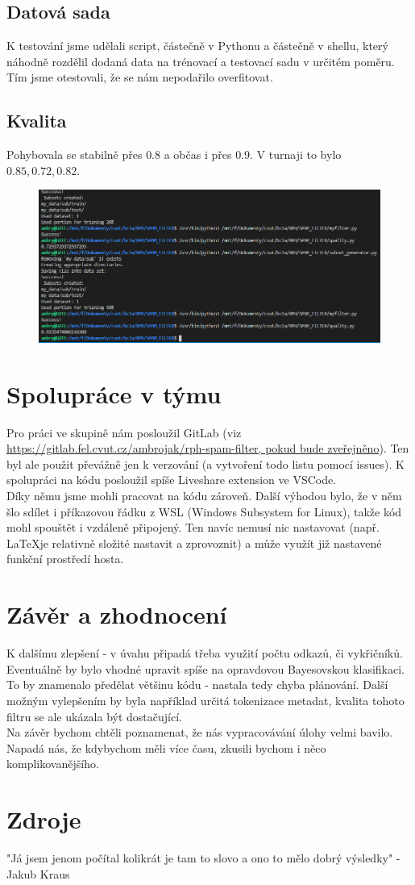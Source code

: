 \documentclass[12pt]{article}
\begin{document}
\subsection{Datová sada}
K testování jsme udělali script, částečně v Pythonu a částečně v shellu, který náhodně rozdělil dodaná data na trénovací a testovací sadu v určitém poměru. Tím jsme otestovali, že se nám nepodařilo overfitovat.
\subsection{Kvalita}
Pohybovala se stabilně přes $0.8$ a občas i přes $0.9$. V turnaji to bylo $0.85, 0.72, 0.82$.
\begin{figure}[htp]
\includegraphics[width=1\textwidth]{uspesnost.png}
\end{figure}
\section{Spolupráce v týmu}
Pro práci ve skupině nám posloužil GitLab (viz \url{https://gitlab.fel.cvut.cz/ambrojak/rph-spam-filter, pokud bude zveřejněno}). Ten byl ale použit převážně jen k verzování (a vytvoření todo listu pomocí issues). K spolupráci na kódu posloužil spíše Liveshare extension ve VSCode.\\
Díky němu jsme mohli pracovat na kódu zároveň. Další výhodou bylo, že v něm šlo sdílet i příkazovou řádku z WSL (Windows Subsystem for Linux), takže kód mohl spouštět i vzdáleně připojený. Ten navíc nemusí nic nastavovat (např. \LaTeX je relativně složité nastavit a zprovoznit) a může využít již nastavené funkční prostředí hosta.
\section{Závěr a zhodnocení}
K dalšímu zlepšení - v úvahu připadá třeba využití počtu odkazů, či vykřičníků. Eventuálně by bylo vhodné upravit spíše na opravdovou Bayesovskou klasifikaci. To by znamenalo předělat většinu kódu - nastala tedy chyba plánování. Další možným vylepšením by byla například určitá tokenizace metadat, kvalita tohoto filtru se ale ukázala být dostačující.\\
Na závěr bychom chtěli poznamenat, že nás vypracovávání úlohy velmi bavilo. Napadá nás, že kdybychom měli více času, zkusili bychom i něco komplikovanějšího.
\section{Zdroje}
"Já jsem jenom počítal kolikrát je tam to slovo a ono to mělo dobrý výsledky" - Jakub Kraus
\end{document}
